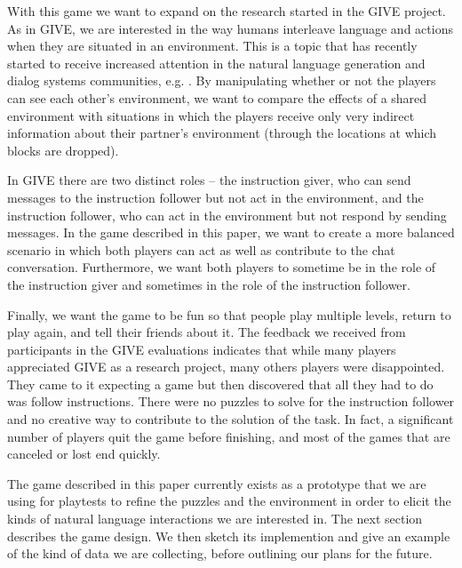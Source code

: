 With this game we want to expand on the research started in the GIVE
project. As in GIVE, we are interested in the way humans interleave
language and actions when they are situated in an environment. This is
a topic that has recently started to receive increased attention in
the natural language generation and dialog systems communities, e.g.
\cite{stoia-etal-2006,garoufi-koller-2010,dethlefs-etal-2011}.  By
manipulating whether or not the players can see each other's
environment, we want to compare the effects of a shared environment
with situations in which the players receive only very indirect
information about their partner's environment (through the locations
at which blocks are dropped).

In GIVE there are two distinct roles -- the instruction giver, who can
send messages to the instruction follower but not act in the
environment, and the instruction follower, who can act in the
environment but not respond by sending messages. In the game described
in this paper, we want to create a more balanced scenario in which
both players can act as well as contribute to the chat
conversation. Furthermore, we want both players to sometime be in the
role of the instruction giver and sometimes in the role of the
instruction follower.


Finally, we want the game to be fun so that people play multiple
levels, return to play again, and tell their friends about it.  The
feedback we received from participants in the GIVE evaluations
indicates that while many players appreciated GIVE as a research
project, many others players were disappointed. They came to it
expecting a game but then discovered that all they had to do was
follow instructions. There were no puzzles to solve for the
instruction follower and no creative way to contribute to the solution
of the task. In fact, a significant number of players quit the game
before finishing, and most of the games that are canceled or lost end
quickly.

The game described in this paper currently exists as a prototype that
we are using for playtests to refine the puzzles and the environment
in order to elicit the kinds of natural language interactions we are
interested in. The next section describes the game design. We then
sketch its implemention and give an example of the kind of data we
are collecting, before outlining our plans for the future.


